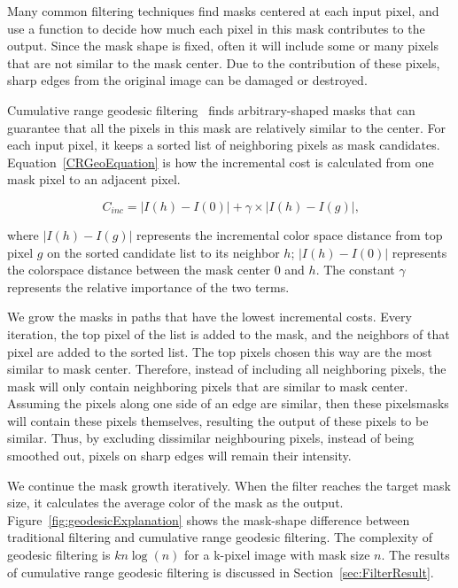 Many common filtering techniques find masks centered at each input pixel, and use a function to decide how much each pixel in this mask contributes to the output. Since the mask shape is fixed, often it will include some or many pixels that are not similar to the mask center. Due to the contribution of these pixels, sharp edges from the original image can be damaged or destroyed.

Cumulative range geodesic filtering~\cite{David:geo, Mould2} finds arbitrary-shaped masks that can guarantee that all the pixels in this mask are relatively similar to the center. For each input pixel, it keeps a sorted list of neighboring pixels as mask candidates. Equation~\eqref{CRGeoEquation} is how the incremental cost is calculated from one mask pixel to an adjacent pixel.

\begin{equation}\label{CRGeoEquation}
C_{inc} = |I(h)-I(0)| + \gamma \times |I(h)-I(g)| \text{,}
\end{equation}

where $|I(h)-I(g)|$ represents the incremental color space distance from top pixel $g$ on the sorted candidate list to its neighbor $h$; $|I(h)-I(0)|$ represents the colorspace distance between the mask center $0$ and $h$. The constant $\gamma$  represents the relative importance of the two terms. 

We grow the masks  in paths that have the lowest incremental costs. Every iteration, the top pixel of the list is added to the mask, and the neighbors of that pixel are added to the sorted list. The top pixels chosen this way are the most similar to mask center. Therefore, instead of including all neighboring pixels, the mask will only contain neighboring pixels that are similar to mask center. Assuming the pixels along one side of an edge are similar, then these pixels\textquotesingle masks will contain these pixels themselves, resulting the output of these pixels to be similar. Thus, by excluding dissimilar neighbouring pixels, instead of being smoothed out, pixels on sharp edges will remain their intensity.

We continue the mask growth iteratively. When the filter reaches the target mask size, it calculates the average color of the mask as the output. Figure~\ref{fig:geodesicExplanation} shows the mask-shape difference between traditional filtering and cumulative range geodesic filtering.
The complexity of geodesic filtering is $kn\log(n)$ for a k-pixel image with mask size $n$. 
The results of cumulative range geodesic filtering is discussed in Section~\ref{sec:FilterResult}.

